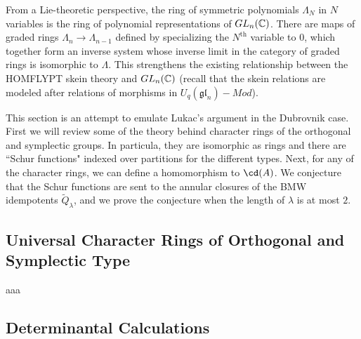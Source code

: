 From a Lie-theoretic perspective, the ring of symmetric polynomials $\Lambda_N$ in $N$ variables is the ring of polynomial representations of $GL_n(\mathbb{C})$. There are maps of graded rings $\Lambda_n \to \Lambda_{n-1}$ defined by specializing the $N^{\mathrm{th}}$ variable to $0$, which together form an inverse system whose inverse limit in the category of graded rings is isomorphic to $\Lambda$. This strengthens the existing relationship between the HOMFLYPT skein theory and $GL_n(\mathbb{C})$ (recall that the skein relations are modeled after relations of morphisms in $U_q(\mathfrak{gl}_n)-Mod$). 

This section is an attempt to emulate Lukac's argument in the Dubrovnik case. First we will review some of the theory behind character rings of the orthogonal and symplectic groups. In particula, they are isomorphic as rings and there are ``Schur functions" indexed over partitions for the different types. Next, for any of the character rings, we can define a homomorphism to $\cd(A)$. We conjecture that the Schur functions are sent to the annular closures of the BMW idempotents $\tilde{Q}_\lambda$, and we prove the conjecture when the length of $\lambda$ is at most $2$.








\subsection{Universal Character Rings of Orthogonal and Symplectic Type}

aaa












\subsection{Determinantal Calculations}

